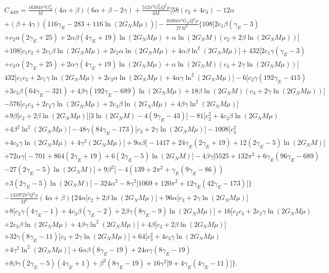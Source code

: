 \documentclass[10pt,a4paper]{article}
\begin{document}
\begin{multline}
    C_{AdS}=\frac{16384\pi^4G^2_N}{M}(4\alpha+\beta)(6\alpha+\beta-2\gamma)+\frac{512\pi^3G^2_NQ^2\rho}{3M}\Big[58(c_2+4c_3)-12\alpha\\
    +(\beta+4\gamma)\left(116\gamma_E-283+116\ln(2G_NM\mu)\right)\Big]-\frac{16384\pi^4G_NQ^2\rho}{27M^3}\bigg\{108\Big[2c_1\beta(\gamma_E-3)\\
    +c_2\alpha(2\gamma_E+25)+2\alpha\beta(4\gamma_E+19)\ln(2G_NM\mu)+\alpha\ln(2G_NM)\left(c_2+2\beta\ln(2G_NM\mu)\right)\Big]
    \\+108\Big[c_1c_2+2c_1\beta\ln(2G_NM\mu)+2c_2\alpha\ln(2G_NM\mu)+4\alpha\beta\ln^2(2G_NM\mu)\Big]+432\Big[2c_1\gamma(\gamma_E-3)\\
    +c_3\alpha(2\gamma_E+25)+2\alpha\gamma(4\gamma_E+19)\ln(2G_NM\mu)
    +\alpha\ln(2G_NM)\left(c_3+2\gamma\ln(2G_NM\mu)\right)\Big]\\
    432\Big[c_1c_3+2c_1\gamma\ln(2G_NM\mu)+2c_3\alpha\ln(2G_NM\mu)+4\alpha\gamma\ln^2(2G_NM\mu)\Big]-6\Big[c_2\gamma(192\gamma_E-415)\\
    +3c_3\beta(64\gamma_E-321)+4\beta\gamma(192\gamma_E-689)\ln(2G_NM\mu)+18\beta\ln(2G_NM)\left(c_3+2\gamma\ln(2G_NM\mu)\right)\Big]\\
    -576\Big[c_2c_3+2c_2\gamma\ln(2G_NM\mu)+2c_3\beta\ln(2G_NM\mu)+4\beta\gamma\ln^2(2G_NM\mu)\Big]\\
    +9\beta\Big[c_2+2\beta\ln(2G_NM\mu)\Big]\Big[3\ln(2G_NM)-4(9\gamma_E-43)\Big]-81\Big[c^2_2+4c_2\beta\ln(2G_NM\mu)\\
    +4\beta^2\ln^2(2G_NM\mu)\Big]-48\gamma(84\gamma_E-173)\Big[c_3+2\gamma\ln(2G_NM\mu)\Big]-1008\Big[c^2_3\\
    +4c_3\gamma\ln(2G_NM\mu)+4\gamma^2(2G_NM\mu)\Big]+9\alpha\beta\Big[-1417+24\gamma_E(2\gamma_E+19)+12(2\gamma_E-5)\ln(2G_NM)\Big]\\
    +72\alpha\gamma\Big[-701+864(2\gamma_E+19)+6(2\gamma_E-5)\ln(2G_NM)\Big]-4\beta\gamma\Big[5525+132\pi^2+6\gamma_E(96\gamma_E-689)\\
    -27(2\gamma_E-5)\ln(2G_NM)\Big]+9\beta^2\Big[-4\left(139+2\pi^2+\gamma_E(9\gamma_E-86)\right)\\
    +3(2\gamma_E-5)\ln(2G_NM)\Big]-324\alpha^2-8\gamma^2\Big[1069+120\pi^2+12\gamma_E(42\gamma_E-173)\Big]\bigg\}\\
    -\frac{131072\pi^5Q^2\rho}{M^5}(4\alpha+\beta)\bigg\{24\alpha\Big[c_2+2\beta\ln(2G_NM\mu)\Big]+96\alpha\Big[c_3+2\gamma\ln(2G_NM\mu)\Big]\\
    +8\Big[c_2\gamma(4\gamma_E-1)+4c_3\beta(\gamma_E-2)+2\beta\gamma(8\gamma_E-9)\ln(2G_NM\mu)\Big]+16\Big[c_2c_3+2c_2\gamma\ln(2G_NM\mu)\\
    +2c_3\beta\ln(2G_NM\mu)+4\beta\gamma\ln^2(2G_NM\mu)\Big]+4\beta\Big[c_2+2\beta\ln(2G_NM\mu)\Big]\\
    +32\gamma(8\gamma_E-11)\Big[c_3+2\gamma\ln(2G_NM\mu)\Big]+64\Big[c^2_3+4c_3\gamma\ln(2G_NM\mu)\\+4\gamma^2\ln^2(2G_NM\mu)\Big]
    +6\alpha\beta(8\gamma_E-19)+24\alpha\gamma(8\gamma_E-19)\\+8\beta\gamma(2\gamma_E-5)(4\gamma_E+1)
    +\beta^2(8\gamma_E-19)+16\gamma^2\Big[9+4\gamma_E(4\gamma_E-11)\Big]\bigg\}.
\end{multline}
\end{document}
